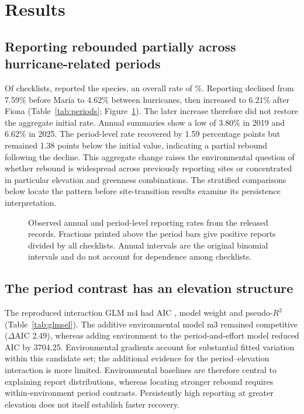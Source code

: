 \section{Results}
\subsection{Reporting rebounded partially across hurricane-related periods}
Of \nChecklists{} checklists, \nDetections{} reported the species, an overall rate of \nEncounterPct{}\%. Reporting declined from 7.59\% before Mar\'ia to 4.62\% between hurricanes, then increased to 6.21\% after Fiona (Table~\ref{tab:periods}; Figure~\ref{fig:rates}). The later increase therefore did not restore the aggregate initial rate. Annual summaries show a low of 3.80\% in 2019 and 6.62\% in 2025. The period-level rate recovered by 1.59 percentage points but remained 1.38 points below the initial value, indicating a partial rebound following the decline. This aggregate change raises the environmental question of whether rebound is widespread across previously reporting sites or concentrated in particular elevation and greenness combinations. The stratified comparisons below locate the pattern before site-transition results examine its persistence interpretation.
\begin{figure}[htbp]\centering
{}
\caption{Observed annual and period-level reporting rates from the released records. Fractions printed above the period bars give positive reports divided by all checklists. Annual intervals are the original binomial intervals and do not account for dependence among checklists.}\label{fig:rates}
\end{figure}



\subsection{The period contrast has an elevation structure}
The reproduced interaction GLM m4 had AIC \aicMfour{}, model weight \wMfour{} and pseudo-$R^2$ \pseudoRMfour{} (Table~\ref{tab:glmsel}). The additive environmental model m3 remained competitive ($\Delta$AIC 2.49), whereas adding environment to the period-and-effort model reduced AIC by 3704.25. Environmental gradients account for substantial fitted variation within this candidate set; the additional evidence for the period--elevation interaction is more limited. Environmental baselines are therefore central to explaining report distributions, whereas locating stronger rebound requires within-environment period contrasts. Persistently high reporting at greater elevation does not itself establish faster recovery.

